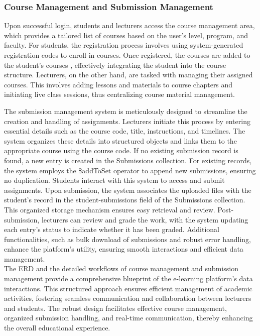 \documentclass[a4paper,12pt]{article}  %
\begin{document}
\subsubsection{Course Management and Submission Management}
Upon successful login, students and lecturers access the course management area, which provides a tailored list of courses based on the user’s level, program, and faculty. For students, the registration process involves using system-generated registration codes to enroll in courses. Once registered, the courses are added to the student's courses , effectively integrating the student into the course structure. Lecturers, on the other hand, are tasked with managing their assigned courses. This involves adding lessons and materials to course chapters and initiating live class sessions, thus centralizing course material management.

The submission management system is meticulously designed to streamline the creation and handling of assignments. Lecturers initiate this process by entering essential details such as the course code, title, instructions, and timelines. The system organizes these details into structured objects and links them to the appropriate course using the course code. If no existing submission record is found, a new entry is created in the Submissions collection. For existing records, the system employs the \$addToSet operator to append new submissions, ensuring no duplication. Students interact with this system to access and submit assignments. Upon submission, the system associates the uploaded files with the student’s record in the student-submissions field of the Submissions collection. This organized storage mechanism ensures easy retrieval and review. Post-submission, lecturers can review and grade the work, with the system updating each entry's status to indicate whether it has been graded. Additional functionalities, such as bulk download of submissions and robust error handling, enhance the platform’s utility, ensuring smooth interactions and efficient data management.\\
The ERD and the detailed workflows of course management and submission management provide a comprehensive blueprint of the e-learning platform’s data interactions. This structured approach ensures efficient management of academic activities, fostering seamless communication and collaboration between lecturers and students. The robust design facilitates effective course management, organized submission handling, and real-time communication, thereby enhancing the overall educational experience.\\
\end{document}
